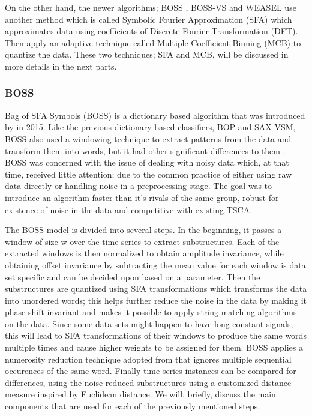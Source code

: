On the other hand, the newer algorithms; BOSS \cite{schafer2015boss}, BOSS-VS \cite{schafer2016scalable} and WEASEL \cite{schafer2017fast}
use another method which is called Symbolic Fourier Approximation (SFA) which approximates data using coefficients of Discrete Fourier Transformation (DFT).
Then apply an adaptive technique called Multiple Coefficient Binning (MCB) to quantize the data.
These two techniques; SFA and MCB, will be discussed in more details in the next parts.

\subsubsection{BOSS}
\label{SubsubsectionBOSS}
Bag of SFA Symbols (BOSS) is a dictionary based algorithm that was introduced by \cite{schafer2015boss} in 2015.
Like the previous dictionary based classifiers, BOP and SAX-VSM,
BOSS also used a windowing technique to extract patterns from the data and transform them into words, but it had other significant differences to them \cite{bagnall2017great}.
BOSS was concerned with the issue of dealing with noisy data which, at that time, received little attention; due to the common practice of
either using raw data directly or handling noise in a preprocessing stage. The goal was to introduce an algorithm faster than it's rivals of the same group,
robust for existence of noise in the data and competitive with existing TSCA.

The BOSS model is divided into several steps. In the beginning, it passes a window of size w over the time series to extract substructures.
Each of the extracted windows is then normalized to obtain amplitude invariance, while obtaining offset invariance by subtracting the mean value
for each window is data set specific and can be decided upon based on a parameter.
Then the substructures are quantized using SFA transformations which transforms the data into unordered words;
this helps further reduce the noise in the data by making it phase shift invariant and makes it possible to apply string matching algorithms on the data.
Since some data sets might happen to have long constant signals, this will lead to SFA transformations of their windows to produce the same words multiple times
and cause higher weights to be assigned for them. BOSS applies a numerosity reduction technique adopted from \cite{lin2007experiencing,lin2012rotation}
that ignores multiple sequential occurences of the same word.
Finally time series instances can be compared for differences, using the noise reduced substructures using a customized distance measure inspired by Euclidean distance.
We will, briefly, discuss the main components that are used for each of the previously mentioned steps.


